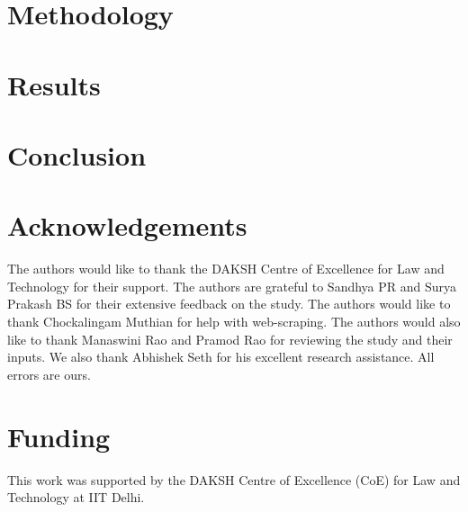 \documentclass[12pt,a4paper]{article}
\begin{document}
\section{Methodology}
\label{sec:methodology}


\section{Results}
\label{sec:results}


\section{Conclusion}
\label{sec:conclusion}


\newpage

\section*{Acknowledgements}
The authors would like to thank the DAKSH Centre of Excellence for Law and Technology for their support. The authors are grateful to Sandhya PR and Surya Prakash BS for their extensive feedback on the study. The authors would like to thank Chockalingam Muthian for help with web-scraping. The authors would also like to thank Manaswini Rao and Pramod Rao for reviewing the study and their inputs. We also thank Abhishek Seth for his excellent research assistance. All errors are ours.

\section*{Funding}
This work was supported by the DAKSH Centre of Excellence (CoE) for Law and Technology at IIT Delhi.

\newpage
\printbibliography[heading=bibintoc]

\newpage
\begin{appendices}

\end{appendices}
\end{document}
